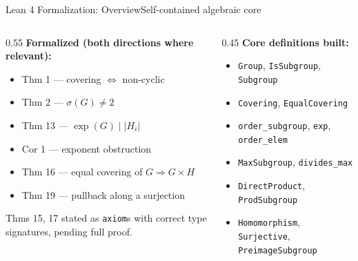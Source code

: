 \documentclass[9pt,aspectratio=169]{beamer}
\begin{document}
\begin{frame}{Lean 4 Formalization: Overview}{Self-contained algebraic core}
\begin{columns}[T]
\begin{column}{0.55\textwidth}
\textbf{Formalized (both directions where relevant):}
\begin{itemize}
\item Thm 1 — covering $\iff$ non-cyclic
\item Thm 2 — $\sigma(G)\ne 2$
\item Thm 13 — $\exp(G)\mid|H_i|$
\item Cor 1 — exponent obstruction
\item Thm 16 — equal covering of $G\Rightarrow G\times H$
\item Thm 19 — pullback along a surjection
\end{itemize}
\small Thms 15, 17 stated as \texttt{axiom}s with correct type signatures, pending full proof.
\end{column}
\begin{column}{0.45\textwidth}
\textbf{Core definitions built:}
\begin{itemize}
\item \texttt{Group}, \texttt{IsSubgroup}, \texttt{Subgroup}
\item \texttt{Covering}, \texttt{EqualCovering}
\item \texttt{order\_subgroup}, \texttt{exp}, \texttt{order\_elem}
\item \texttt{MaxSubgroup}, \texttt{divides\_max}
\item \texttt{DirectProduct}, \texttt{ProdSubgroup}
\item \texttt{Homomorphism}, \texttt{Surjective}, \texttt{PreimageSubgroup}
\end{itemize}
\end{column}
\end{columns}
\end{frame}
\end{document}
